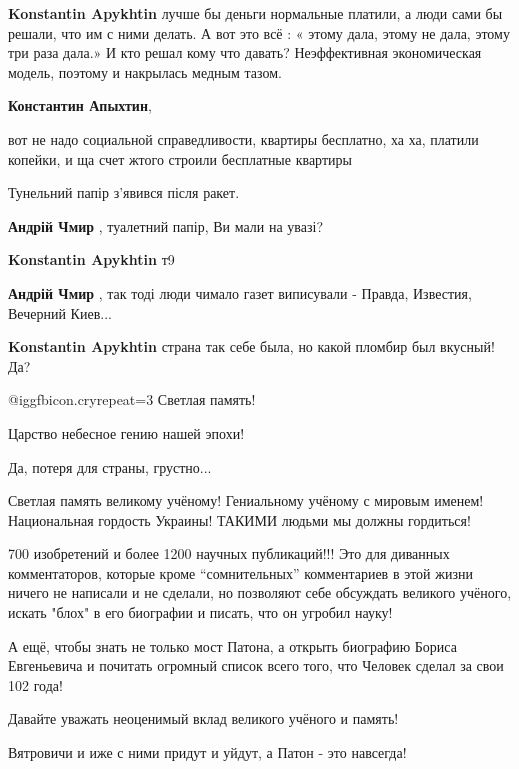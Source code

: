 \begin{itemize}
\begin{itemize}
\begin{itemize}
\textbf{Konstantin Apykhtin} лучше бы деньги нормальные платили, а люди сами бы решали, что им с ними делать. А вот это всё : « этому дала, этому не дала, этому три раза дала.» И кто решал кому что давать? Неэффективная экономическая модель, поэтому и накрылась медным тазом.

\textbf{Константин Апыхтин},

вот не надо социальной справедливости, квартиры бесплатно, ха ха, платили
копейки, и ща счет жтого строили бесплатные квартиры
\end{itemize} %

Тунельний папір з'явився після ракет.

\textbf{Андрій Чмир} , туалетний папір, Ви мали на увазі?

\textbf{Konstantin Apykhtin} т9

\textbf{Андрій Чмир} , так тоді люди чимало газет виписували - Правда, Известия, Вечерний Киев...

\textbf{Konstantin Apykhtin} страна так себе была, но какой пломбир был вкусный! Да?

\end{itemize} %

 @igg{fbicon.cry}{repeat=3}  Светлая память!

Царство небесное гению нашей эпохи!

Да, потеря для страны, грустно...


Светлая память великому учёному! Гениальному учёному с мировым именем!
Национальная гордость Украины! ТАКИМИ людьми мы должны гордиться!

700 изобретений и более 1200 научных публикаций!!! Это для диванных
комментаторов, которые кроме \enquote{сомнительных} комментариев в этой жизни ничего не
написали и не сделали, но позволяют себе обсуждать великого учёного, искать
"блох" в его биографии и писать, что он угробил науку!

А ещё, чтобы знать не только мост Патона, а открыть биографию Бориса
Евгеньевича и почитать огромный список всего того, что Человек сделал за свои
102 года!

Давайте уважать неоценимый вклад великого учёного и память!

Вятровичи и иже с ними придут и уйдут, а Патон - это навсегда!


\end{itemize}
